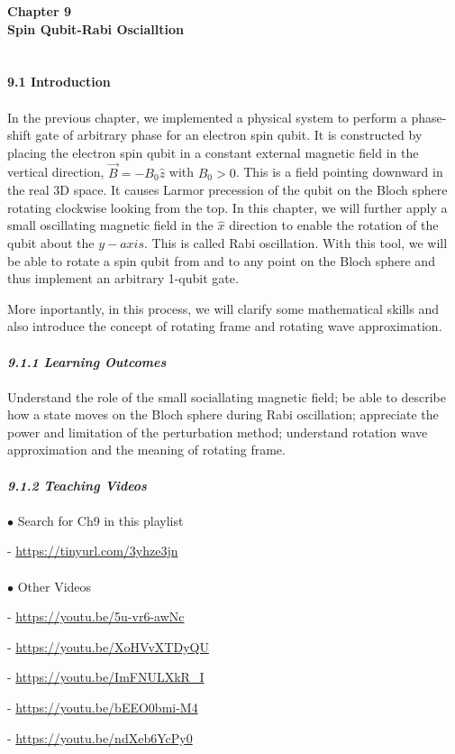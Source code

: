 \documentclass{article}
\newcommand{\bfit}[1]{\textit{\textbf{#1}}}
\begin{document}
\textbf{\Large Chapter 9\\
Spin Qubit-Rabi Oscialltion}\\\\\\
\textbf{\large 9.1 Introduction}\\\\
In the previous chapter, we implemented a physical system to perform a phase-shift gate
of arbitrary phase for an electron spin qubit. It is constructed by placing the electron
spin qubit in a constant external magnetic field in the vertical direction, $\vec{B}=-B_0\hat{z}$
with $B_0>0$. This is a field pointing downward in the real 3D space. It causes
Larmor precession of the qubit on the Bloch sphere rotating clockwise looking from the top.
In this chapter, we will further apply a small oscillating magnetic field in the 
$\hat{x}$ direction to enable the rotation of the qubit about the $y-axis$. This is called 
Rabi oscillation. With this tool, we will be able to rotate a spin qubit from and to 
any point on the Bloch sphere and thus implement an arbitrary 1-qubit gate.

More inportantly, in this process, we will clarify some mathematical skills and
also introduce the concept of rotating frame and rotating wave approximation.\\\\
\bfit{\large 9.1.1 Learning Outcomes}\\\\
Understand the role of the small sociallating magnetic field; be able to describe
how a state moves on the Bloch sphere during Rabi oscillation; appreciate the power and
limitation of the perturbation method; understand rotation wave approximation and the 
meaning of rotating frame.\\\\
\bfit{\large 9.1.2 Teaching Videos}\\\\
$\bullet$ Search for Ch9 in this playlist

- \url{https://tinyurl.com/3yhze3jn}\\\\
$\bullet$ Other Videos

- \url{https://youtu.be/5u-vr6-awNc}

- \url{https://youtu.be/XoHVvXTDyQU}

- \url{https://youtu.be/ImFNULXkR_I}

- \url{https://youtu.be/bEEO0bmi-M4}

- \url{https://youtu.be/ndXeb6YcPy0}
\end{document}
